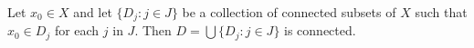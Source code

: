Let $x_0 \in X$ and let $\{D_j: j \in J\}$ be a collection of connected subsets of $X$ such that $x_0 \in D_j$ for each $j$ in $J$. Then $D = \bigcup \{D_j: j \in J\}$ is connected.
